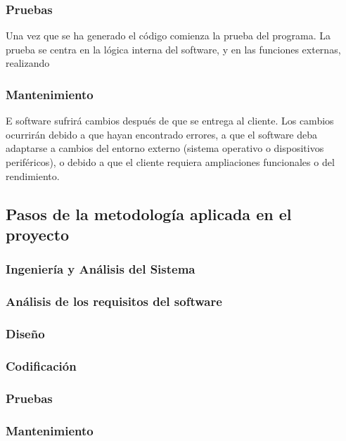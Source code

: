             \subsubsection{Pruebas}
            Una vez que se ha generado el código comienza la prueba del programa. La prueba se centra en la lógica interna del software, y en las funciones externas, realizando
            \subsubsection{Mantenimiento}
            E software sufrirá cambios después de que se entrega al cliente. Los cambios ocurrirán debido a que hayan encontrado errores, a que el software deba adaptarse a cambios del entorno externo (sistema operativo o dispositivos periféricos), o debido a que el cliente requiera ampliaciones funcionales o del rendimiento.

    \subsection{Pasos de la metodología aplicada en el proyecto}
          \subsubsection{Ingeniería y Análisis del Sistema}
          \subsubsection{Análisis de los requisitos del software}
          \subsubsection{Diseño}
          \subsubsection{Codificación}
          \subsubsection{Pruebas}
          \subsubsection{Mantenimiento}
